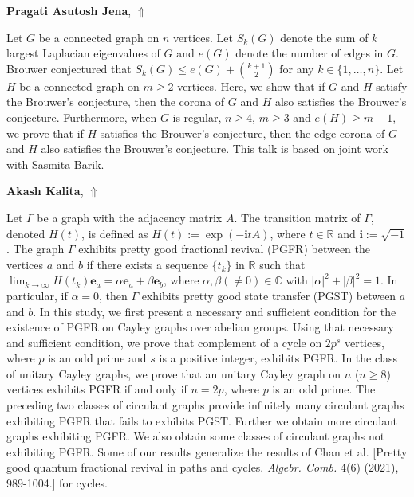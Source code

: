 \documentclass[ILAS2025-program.tex]{subfiles}
\begin{document}
\hypertarget{down0082}{}\begin{ilasabstract}
    
\textbf{Pragati Asutosh Jena},  \hfill \hyperlink{up0082}{$\Uparrow$}
    
    
\mtskip
    Let $G$ be a connected graph on $n$ vertices. Let $S_k(G)$ denote the sum of $k$ largest Laplacian eigenvalues of $G$ and $e(G)$ denote the number of edges in $G$. Brouwer conjectured that $S_k(G)\leq e(G)+\binom{k+1}{2}$ for any $k\in \{1,\ldots,n\}$. Let $H$ be a connected graph on $m\geq 2$ vertices. Here, we show that if $G$ and $H$ satisfy the Brouwer's conjecture, then the corona of $G$ and $H$ also satisfies the Brouwer's conjecture. Furthermore, when $G$ is regular, $n\geq 4$, $m\geq 3$ and $e(H)\geq m+1$, we prove that if $H$ satisfies the Brouwer's conjecture, then the edge corona of $G$ and $H$ also satisfies the Brouwer's conjecture. This talk is based on joint work with Sasmita Barik.
\end{ilasabstract}
    

\hypertarget{down0408}{}\begin{ilasabstract}
    
\textbf{Akash Kalita},  \hfill \hyperlink{up0408}{$\Uparrow$}
    
    
\mtskip
    Let $\Gamma$ be a graph with the adjacency matrix $A$. The transition matrix of $\Gamma$, denoted $H(t)$, is defined as $H(t) := \exp(-\textbf{i}tA)$, where $t \in \mathbb{R}$ and $\textbf{i} := \sqrt{-1}$. The graph $\Gamma$ exhibits pretty good fractional revival (PGFR) between the vertices $a$ and $b$ if there exists a sequence $\{t_k\}$ in $\mathbb{R}$ such that $\lim_{k\to\infty} H(t_k){\textbf{e}_{a}} = \alpha{\textbf{e}_{a}} + \beta{\textbf{e}_{b}}$, where $\alpha, \beta(\neq 0) \in \mathbb{C}$ with $|\alpha|^2 + |\beta|^2 = 1$. In particular, if $\alpha = 0$, then $\Gamma$ exhibits pretty good state transfer (PGST) between $a$ and $b$. In this study, we first present a necessary and sufficient condition for the existence of PGFR on Cayley graphs over abelian groups. Using that necessary and sufficient condition, we prove that complement of a cycle on $2 p^s$ vertices, where $p$ is an odd prime and $s$ is a positive integer, exhibits PGFR.  In the class of unitary Cayley graphs, we prove that an unitary Cayley graph on $n$ ($n \geq 8$) vertices exhibits PGFR if and only if $n = 2p$, where $p$ is an odd prime. The preceding two classes of circulant graphs provide infinitely many circulant graphs exhibiting PGFR that fails to exhibits PGST. Further we obtain more circulant graphs exhibiting PGFR. We also obtain some classes of circulant graphs not exhibiting PGFR. Some of our results generalize the results of Chan et al. [Pretty good quantum fractional revival in paths and cycles. \textit {Algebr. Comb.} 4(6) (2021), 989-1004.] for cycles.        

\end{ilasabstract}
    
\end{document}
